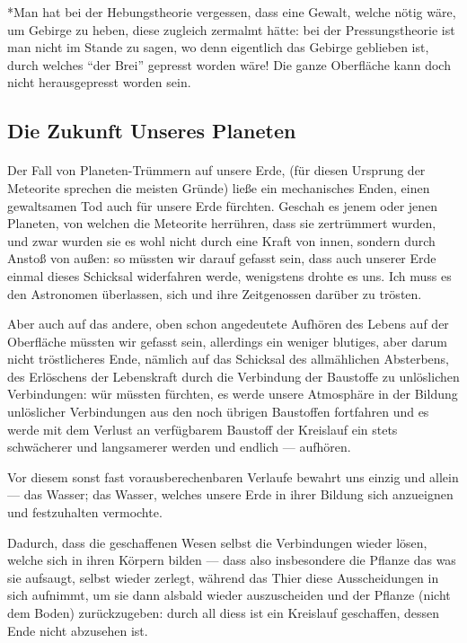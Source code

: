 \documentclass[a4paper, 12pt, oneside]{article}
\begin{document}
*Man hat bei der Hebungstheorie vergessen, dass eine Gewalt, welche nötig wäre, um Gebirge zu heben, diese zugleich zermalmt hätte: bei der Pressungstheorie ist man nicht im Stande zu sagen, wo denn eigentlich das Gebirge geblieben ist, durch welches "`der Brei"' gepresst worden wäre! Die ganze Oberfläche kann doch nicht herausgepresst worden sein.
\clearpage
\subsection{Die Zukunft Unseres Planeten}
\paragraph{}
Der Fall von Planeten-Trümmern auf unsere Erde, (für diesen Ursprung der Meteorite sprechen die meisten Gründe) ließe ein mechanisches Enden, einen gewaltsamen Tod auch für unsere Erde fürchten. Geschah es jenem oder jenen Planeten, von welchen die Meteorite herrühren, dass sie zertrümmert wurden, und zwar wurden sie es wohl nicht durch eine Kraft von innen, sondern durch Anstoß von außen: so müssten wir darauf gefasst sein, dass auch unserer Erde einmal dieses Schicksal widerfahren werde, wenigstens drohte es uns. Ich muss es den Astronomen überlassen, sich und ihre Zeitgenossen darüber zu trösten.

Aber auch auf das andere, oben schon angedeutete Aufhören des Lebens auf der Oberfläche müssten wir gefasst sein, allerdings ein weniger blutiges, aber darum nicht tröstlicheres Ende, nämlich auf das Schicksal des allmählichen Absterbens, des Erlöschens der Lebenskraft durch die Verbindung der Baustoffe zu unlöslichen Verbindungen: wür müssten fürchten, es werde unsere Atmosphäre in der Bildung unlöslicher Verbindungen aus den noch übrigen Baustoffen fortfahren und es werde mit dem Verlust an verfügbarem Baustoff der Kreislauf ein stets schwächerer und langsamerer werden und endlich — aufhören.

Vor diesem sonst fast vorausberechenbaren Verlaufe bewahrt uns einzig und allein — das Wasser; das Wasser, welches unsere Erde in ihrer Bildung sich anzueignen und festzuhalten vermochte.

Dadurch, dass die geschaffenen Wesen selbst die Verbindungen wieder lösen, welche sich in ihren Körpern bilden — dass also insbesondere die Pflanze das was sie aufsaugt, selbst wieder zerlegt, während das Thier diese Ausscheidungen in sich aufnimmt, um sie dann alsbald wieder auszuscheiden und der Pflanze (nicht dem Boden) zurückzugeben: durch all diess ist ein Kreislauf geschaffen, dessen Ende nicht abzusehen ist.
\end{document}
